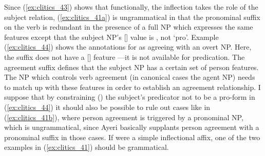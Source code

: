 Since (\ref{ex:clitics_43}) shows that functionally, the inflection takes the
role of the subject relation, (\ref{ex:clitics_41a}) is ungrammatical in that
the pronominal suffix  on the verb is redundant in the
presence of a full NP which expresses the same features except that the subject
NP's [\Pred{}] value is , not `pro'. Example
(\ref{ex:clitics_44}) shows the annotations for  as
agreeing with an overt NP. Here, the suffix does not have a [\Pred{}] feature
---it is not available for predication. The agreement suffix
 defines that the subject NP has a certain set of person
features. The NP which controls verb agreement (in canonical cases the agent
NP) needs to match up with these features in order to establish an agreement
relationship. I suppose that by constraining (\req{}) the subject's predicator
not to be a pro-form in (\ref{ex:clitics_44}) it should also be possible to
rule out cases like in (\ref{ex:clitics_41b}), where person agreement is
triggered by a pronominal NP, which is ungrammatical, since Ayeri basically
supplants person agreement with a pronominal suffix in those cases. If
 were a simple inflectional affix, one of the two examples
in (\ref{ex:clitics_41}) should be grammatical.

\ex\label{ex:clitics_44}
\xe

